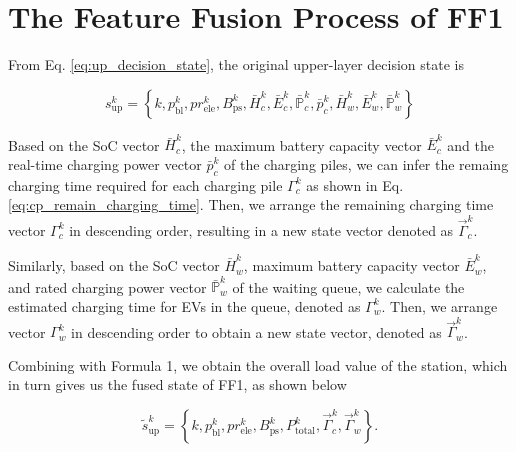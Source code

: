 \documentclass[preprint,12pt]{elsarticle}
\begin{document}



 

\appendix

\section{The Feature Fusion Process of FF1}
From Eq. \ref{eq:up_decision_state}, the original upper-layer decision
state is

\[
s_{\textrm{up}}^{k}=\left\{ k,p_{\textrm{bl}}^{k},pr_{\textrm{ele}}^{k},B_{\textrm{ps}}^{k},\bar{H}_{c}^{k},\bar{E}_{c}^{k},\bar{\mathbb{P}}_{c}^{k},\bar{p}_{c}^{k},\bar{H}_{w}^{k},\bar{E}_{w}^{k},\bar{\mathbb{P}}_{w}^{k}\right\}
\]

Based on the SoC vector $\bar{H}_{c}^{k}$, the maximum battery capacity
vector $\bar{E}_{c}^{k}$ and the real-time charging power vector
$\bar{p}_{c}^{k}$ of the charging piles, we can infer the remaing
charging time required for each charging pile $\varGamma_{c}^{k}$
as shown in Eq. \ref{eq:cp_remain_charging_time}. Then, we arrange
the remaining charging time vector $\varGamma_{c}^{k}$ in descending
order, resulting in a new state vector denoted as $\overrightarrow{\varGamma}_{c}^{k}$.

Similarly, based on the SoC vector $\bar{H}_{w}^{k}$, maximum battery
capacity vector $\bar{E}_{w}^{k}$, and rated charging power vector
$\bar{\mathbb{P}}_{w}^{k}$ of the waiting queue, we calculate the
estimated charging time for EVs in the queue, denoted as $\varGamma_{w}^{k}$.
Then, we arrange vector $\varGamma_{w}^{k}$ in descending order to
obtain a new state vector, denoted as $\overrightarrow{\varGamma}_{w}^{k}$.

Combining with Formula 1, we obtain the overall load value of the
station, which in turn gives us the fused state of FF1, as shown below

\[
\widetilde{s}_{\textrm{up}}^{k}=\left\{ k,p_{\textrm{bl}}^{k},pr_{\textrm{ele}}^{k},B_{\textrm{ps}}^{k},P_{\textrm{total}}^{k},\overrightarrow{\varGamma}_{c}^{k},\overrightarrow{\varGamma}_{w}^{k}\right\} .
\]






\end{document}
